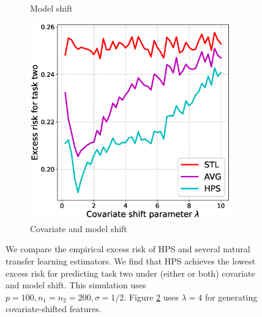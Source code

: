 \begin{figure}[!t]
\begin{subfigure}[b]{0.33\textwidth}
		\caption{Model shift}
		\label{fig_sec5_model}
	\end{subfigure}\hfill%
	\begin{subfigure}[b]{0.33\textwidth}
		\centering
		\includegraphics[width=0.95\textwidth]{figures/compare_risk_cov_model_shift.eps}
		\caption{Covariate and model shift}
		\label{fig_sec5_cov_model}
	\end{subfigure}
	\caption{We compare the empirical excess risk of HPS and several natural transfer learning estimators. We find that HPS achieves the lowest excess risk for predicting task two under (either or both) covariate and model shift. This simulation uses $p = 100, n_1 = n_2 = 200, \sigma = 1/2$. Figure \ref{fig_sec5_cov_model} uses $\lambda = 4$ for generating covariate-shifted features.}
	\label{fig_sec51}
\end{figure}

